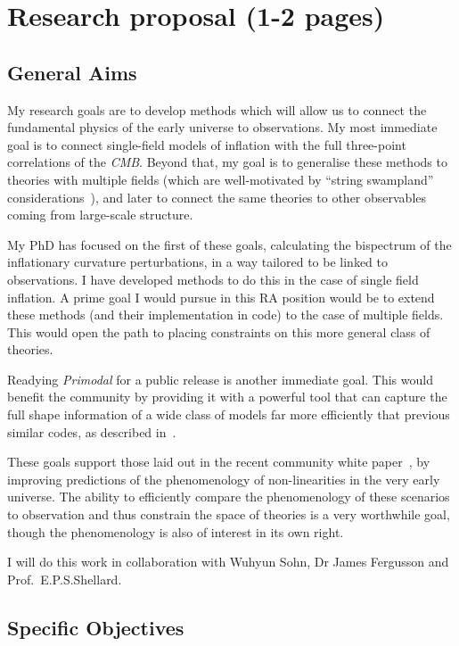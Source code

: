 \section{Research proposal (1-2 pages)}
\subsection{General Aims}
My research goals are to develop methods which will allow us to connect the fundamental physics of the early universe to observations.
My most immediate goal is to connect single-field models of inflation with the full three-point correlations of the \textit{CMB}.
Beyond that, my goal is to generalise these methods to theories with multiple fields
(which are well-motivated by ``string swampland'' considerations~\cite{achucarro_multifield1}),
and later to connect the same theories to other observables coming from large-scale structure.

My PhD has focused on the first of these goals,
calculating the bispectrum of the inflationary curvature perturbations, in a way tailored to be linked to observations.
I have developed methods to do this in the case of single field inflation.
A prime goal I would pursue in this RA position would be to extend these methods (and their implementation in code)
to the case of multiple fields. This would open the path to placing constraints on this
more general class of theories.

Readying \textit{Primodal} for a public release is another immediate goal.
This would benefit the community by providing it with a powerful tool
that can capture the full shape information of a wide class of models far more efficiently
that previous similar codes, as described in~\cite{probing_precision}.


These goals support those laid out in the recent community white paper~\cite{astro2020_png},
by improving predictions of the phenomenology of non-linearities in the very early universe.
The ability to efficiently compare the phenomenology of these scenarios to observation and thus constrain the space of theories is a very worthwhile goal, though the phenomenology is also of interest in its own right.

I will do this work in collaboration with Wuhyun Sohn, Dr James Fergusson and Prof.~E.P.S.Shellard.

\subsection{Specific Objectives}
